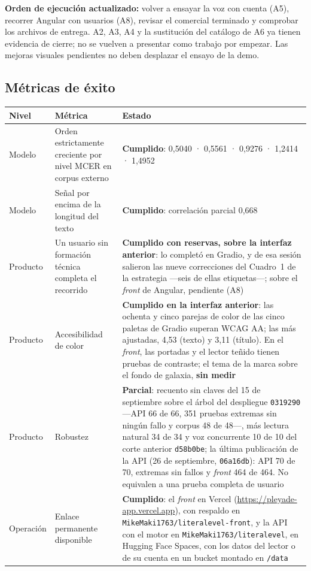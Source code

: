 \documentclass[11pt,a4paper]{article}
\newcommand{\cod}[1]{\texttt{\small #1}}
\begin{document}
\noindent\textbf{Orden de ejecución actualizado:} volver a ensayar la voz con cuenta
(A5), recorrer Angular con usuarios (A8), revisar el comercial terminado y comprobar los archivos
de entrega. A2, A3, A4 y la sustitución del catálogo de A6 ya tienen evidencia de
cierre; no se vuelven a presentar como trabajo por empezar. Las mejoras visuales
pendientes no deben desplazar el ensayo de la demo.

\subsection{Métricas de éxito}

\begin{table}[H]
\centering
\small
\begin{tabularx}{\textwidth}{@{}L{1.9cm} L{6.0cm} Y@{}}
\toprule
\textbf{Nivel} & \textbf{Métrica} & \textbf{Estado} \\
\midrule
Modelo & Orden estrictamente creciente por nivel MCER en corpus externo & \textbf{Cumplido}: 0,5040 · 0,5561 · 0,9276 · 1,2414 · 1,4952 \\
Modelo & Señal por encima de la longitud del texto & \textbf{Cumplido}: correlación parcial 0,668 \\
Producto & Un usuario sin formación técnica completa el recorrido & \textbf{Cumplido con reservas, sobre la interfaz anterior}: lo completó en Gradio, y de esa sesión salieron las nueve correcciones del Cuadro~1 de la estrategia ---seis de ellas etiquetas---; sobre el \emph{front} de Angular, pendiente (A8) \\
Producto & Accesibilidad de color & \textbf{Cumplido en la interfaz anterior}: las ochenta y cinco parejas de color de las cinco paletas de Gradio superan WCAG AA; las más ajustadas, 4,53 (texto) y 3,11 (título). En el \emph{front}, las portadas y el lector teñido tienen pruebas de contraste; el tema de la marca sobre el fondo de galaxia, \textbf{sin medir} \\
Producto & Robustez & \textbf{Parcial}: recuento sin claves del 15 de septiembre sobre el árbol del despliegue \cod{0319290} ---API 66 de 66, 351 pruebas extremas sin ningún fallo y corpus 48 de 48---, más lectura natural 34 de 34 y voz concurrente 10 de 10 del corte anterior \cod{d58b0be}; la última publicación de la API (26 de septiembre, \cod{06a16db}): API 70 de 70, extremas sin fallos y \emph{front} 464 de 464. No equivalen a una prueba completa de usuario \\
Operación & Enlace permanente disponible & \textbf{Cumplido}: el \emph{front} en Vercel (\url{https://pleyade-app.vercel.app}), con respaldo en \cod{MikeMaki1763/\allowbreak literalevel-front}, y la API con el motor en \cod{MikeMaki1763/\allowbreak literalevel}, en Hugging Face Spaces, con los datos del lector o de su cuenta en un bucket montado en \cod{/data} \\

\end{tabularx}
\end{table}
\end{document}
